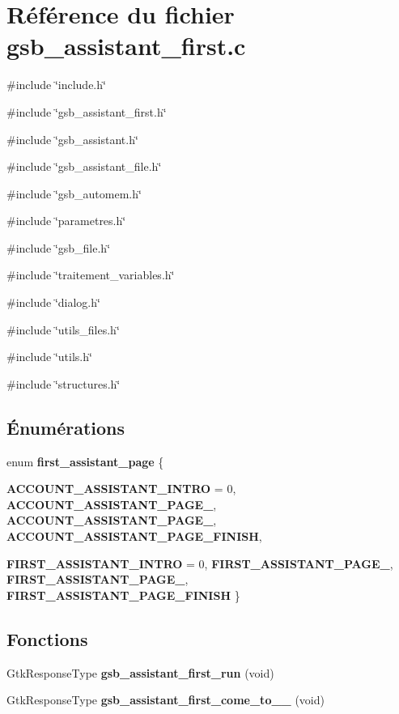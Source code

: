 \section{Référence du fichier gsb\_\-assistant\_\-first.c}
\label{gsb__assistant__first_8c}
{\ttfamily \#include \char`\"{}include.h\char`\"{}}\par
{\ttfamily \#include \char`\"{}gsb\_\-assistant\_\-first.h\char`\"{}}\par
{\ttfamily \#include \char`\"{}gsb\_\-assistant.h\char`\"{}}\par
{\ttfamily \#include \char`\"{}gsb\_\-assistant\_\-file.h\char`\"{}}\par
{\ttfamily \#include \char`\"{}gsb\_\-automem.h\char`\"{}}\par
{\ttfamily \#include \char`\"{}parametres.h\char`\"{}}\par
{\ttfamily \#include \char`\"{}gsb\_\-file.h\char`\"{}}\par
{\ttfamily \#include \char`\"{}traitement\_\-variables.h\char`\"{}}\par
{\ttfamily \#include \char`\"{}dialog.h\char`\"{}}\par
{\ttfamily \#include \char`\"{}utils\_\-files.h\char`\"{}}\par
{\ttfamily \#include \char`\"{}utils.h\char`\"{}}\par
{\ttfamily \#include \char`\"{}structures.h\char`\"{}}\par
\subsection*{Énumérations}
\begin{DoxyCompactItemize}
\item 
enum {\bf first\_\-assistant\_\-page} \{ \par
{\bf ACCOUNT\_\-ASSISTANT\_\-INTRO} =  0, 
{\bf ACCOUNT\_\-ASSISTANT\_\-PAGE\_}, 
{\bf ACCOUNT\_\-ASSISTANT\_\-PAGE\_}, 
{\bf ACCOUNT\_\-ASSISTANT\_\-PAGE\_\-FINISH}, 
\par
{\bf FIRST\_\-ASSISTANT\_\-INTRO} =  0, 
{\bf FIRST\_\-ASSISTANT\_\-PAGE\_}, 
{\bf FIRST\_\-ASSISTANT\_\-PAGE\_}, 
{\bf FIRST\_\-ASSISTANT\_\-PAGE\_\-FINISH}
 \}
\end{DoxyCompactItemize}
\subsection*{Fonctions}
\begin{DoxyCompactItemize}
\item 
GtkResponseType {\bf gsb\_\-assistant\_\-first\_\-run} (void)
\item 
GtkResponseType {\bf gsb\_\-assistant\_\-first\_\-come\_\-to\_\_} (void)
\end{DoxyCompactItemize}
